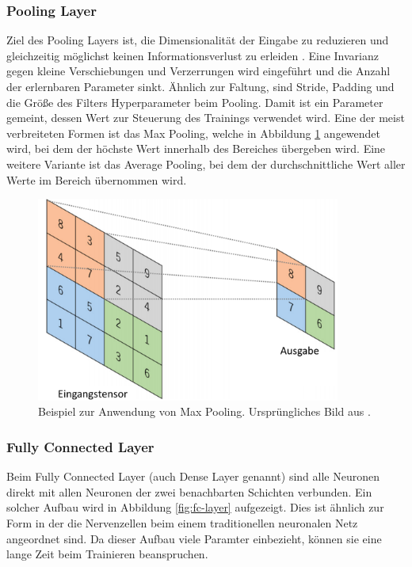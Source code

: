 \subsubsection{Pooling Layer}
Ziel des Pooling Layers ist, die Dimensionalität der Eingabe zu reduzieren und gleichzeitig möglichst keinen Informationsverlust zu erleiden \cite{understanding-of-a-cnn}. Eine Invarianz gegen kleine Verschiebungen und Verzerrungen wird eingeführt und die Anzahl der erlernbaren Parameter sinkt. Ähnlich zur Faltung, sind Stride, Padding und die Größe des Filters Hyperparameter beim Pooling. Damit ist ein Parameter gemeint, dessen Wert zur Steuerung des Trainings verwendet wird. Eine der meist verbreiteten Formen ist das Max Pooling, welche in Abbildung \ref{fig:pooling-layer} angewendet wird, bei dem der höchste Wert innerhalb des Bereiches übergeben wird. Eine weitere Variante ist das Average Pooling, bei dem der durchschnittliche Wert aller Werte im Bereich übernommen wird. \cite {cnns-an-overview-and-application-in-radiology}

\begin{figure}[h!]
\centering
\includegraphics[width=10cm]{98_images/pooling_layer.png}
\caption{Beispiel zur Anwendung von Max Pooling. Ursprüngliches Bild aus \cite{cnns-an-overview-and-application-in-radiology}.}
\label{fig:pooling-layer}
\end{figure}


\subsubsection{Fully Connected Layer}
Beim Fully Connected Layer (auch Dense Layer genannt) sind alle Neuronen direkt mit allen Neuronen der zwei benachbarten Schichten verbunden. Ein solcher Aufbau wird in Abbildung \ref{fig:fc-layer} aufgezeigt. Dies ist ähnlich zur Form in der die Nervenzellen beim einem traditionellen neuronalen Netz angeordnet sind. Da dieser Aufbau viele Paramter einbezieht, können sie eine lange Zeit beim Trainieren beanspruchen. \cite{understanding-of-a-cnn}

